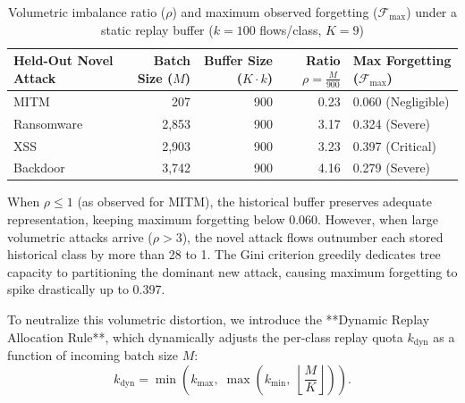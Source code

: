 \begin{table}[!ht]
\centering
\small
\setlength{\tabcolsep}{5pt}
\renewcommand{\arraystretch}{1.2}
\caption{Volumetric imbalance ratio ($\rho$) and maximum observed forgetting ($\mathcal{F}_{\max}$) under a static replay buffer ($k = 100$ flows/class, $K = 9$)}
\label{tab:rho_motivation}
\begin{tabular}{|l|r|r|r|l|}
\hline
\textbf{Held-Out Novel Attack} & \textbf{Batch Size ($M$)} & \textbf{Buffer Size ($K \cdot k$)} & \textbf{Ratio $\rho = \frac{M}{900}$} & \textbf{Max Forgetting ($\mathcal{F}_{\max}$)} \\ \hline
MITM       & 207     & 900 & 0.23 & 0.060 (Negligible) \\
Ransomware & 2{,}853 & 900 & 3.17 & 0.324 (Severe) \\
XSS        & 2{,}903 & 900 & 3.23 & 0.397 (Critical) \\
Backdoor   & 3{,}742 & 900 & 4.16 & 0.279 (Severe) \\ \hline
\end{tabular}
\end{table}

When $\rho \le 1$ (as observed for MITM), the historical buffer preserves adequate representation, keeping maximum forgetting below 0.060. However, when large volumetric attacks arrive ($\rho > 3$), the novel attack flows outnumber each stored historical class by more than 28 to 1. The Gini criterion greedily dedicates tree capacity to partitioning the dominant new attack, causing maximum forgetting to spike drastically up to 0.397.

To neutralize this volumetric distortion, we introduce the **Dynamic Replay Allocation Rule**, which dynamically adjusts the per-class replay quota $k_{\text{dyn}}$ as a function of incoming batch size $M$:
\begin{equation}
k_{\text{dyn}} = \min\!\left( k_{\max},\; \max\!\left( k_{\min},\; \left\lfloor \frac{M}{K} \right\rfloor \right) \right).
\label{eq:dynamic_rule_pw}
\end{equation}


